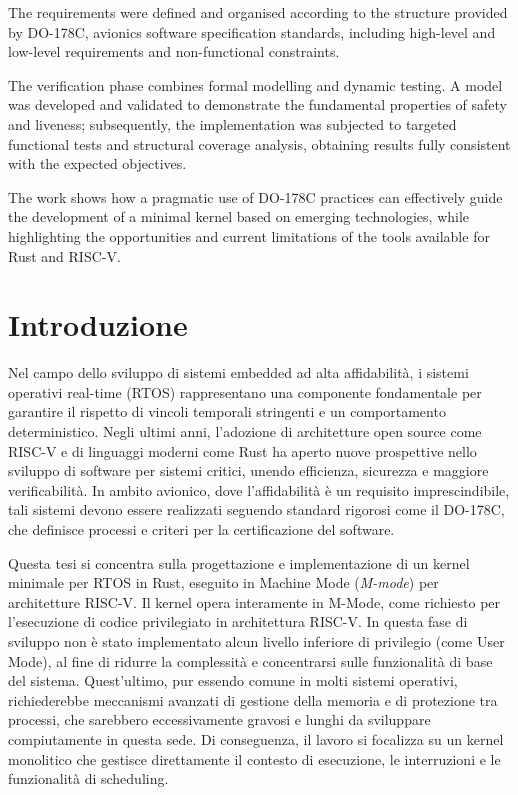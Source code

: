\documentclass[italian, Lau, oneside]{sapthesis} %
\begin{document}
The requirements were defined and organised according to the structure provided by DO-178C, avionics software specification standards, including high-level and low-level requirements and non-functional constraints.

The verification phase combines formal modelling and dynamic testing. A model was developed and validated to demonstrate the fundamental properties of safety and liveness; subsequently, the implementation was subjected to targeted functional tests and structural coverage analysis, obtaining results fully consistent with the expected objectives.

The work shows how a pragmatic use of DO-178C practices can effectively guide the development of a minimal kernel based on emerging technologies, while highlighting the opportunities and current limitations of the tools available for Rust and RISC-V.


\newpage
\tableofcontents

\mainmatter

\chapter*{Introduzione}
\lettrine[lines=2, findent=3pt, nindent=0pt]{N}{}el campo dello sviluppo di sistemi embedded ad alta affidabilità, i sistemi operativi real-time (RTOS) rappresentano una componente fondamentale per garantire il rispetto di vincoli temporali stringenti e un comportamento deterministico.  
Negli ultimi anni, l’adozione di architetture open source come RISC-V e di linguaggi moderni come Rust ha aperto nuove prospettive nello sviluppo di software per sistemi critici, unendo efficienza, sicurezza e maggiore verificabilità.  
In ambito avionico, dove l’affidabilità è un requisito imprescindibile, tali sistemi devono essere realizzati seguendo standard rigorosi come il DO-178C, che definisce processi e criteri per la certificazione del software.

\bigskip
Questa tesi si concentra sulla progettazione e implementazione di un kernel minimale per RTOS in Rust, eseguito in Machine Mode (\textit{M-mode}) per architetture RISC-V.  
Il kernel opera interamente in M-Mode, come richiesto per l’esecuzione di codice privilegiato in architettura RISC-V. In questa fase di sviluppo non è stato implementato alcun livello inferiore di privilegio (come User Mode), al fine di ridurre la complessità e concentrarsi sulle funzionalità di base del sistema. Quest’ultimo, pur essendo comune in molti sistemi operativi, richiederebbe meccanismi avanzati di gestione della memoria e di protezione tra processi, che sarebbero eccessivamente gravosi e lunghi da sviluppare compiutamente in questa sede.  
Di conseguenza, il lavoro si focalizza su un kernel monolitico che gestisce direttamente il contesto di esecuzione, le interruzioni e le funzionalità di scheduling.
\end{document}
